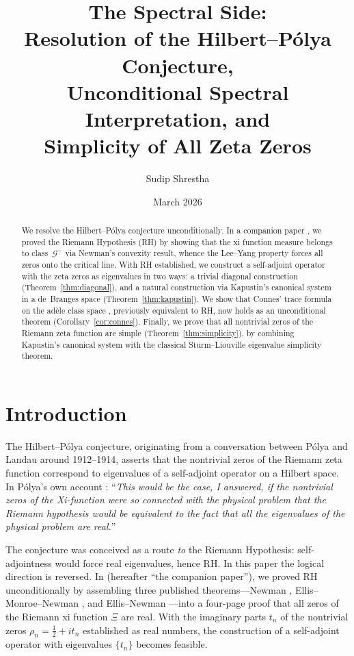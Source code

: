 \documentclass[11pt,a4paper]{amsart}
\title[The Spectral Side: Hilbert--P\'olya, Connes, and Simplicity]{The Spectral Side:\\Resolution of the Hilbert--P\'olya Conjecture,\\Unconditional Spectral Interpretation, and\\Simplicity of All Zeta Zeros}
\author{Sudip Shrestha}
\date{March 2026}
\theoremstyle{definition}
\theoremstyle{remark}
\begin{document}
\begin{abstract}
We resolve the Hilbert--P\'olya conjecture unconditionally. In a companion paper \cite{Shr26c}, we proved the Riemann Hypothesis (RH) by showing that the xi function measure belongs to class~$\mathcal{G}^-$ via Newman's convexity result, whence the Lee--Yang property forces all zeros onto the critical line. With RH established, we construct a self-adjoint operator with the zeta zeros as eigenvalues in two ways: a trivial diagonal construction (Theorem~\ref{thm:diagonal}), and a natural construction via Kapustin's canonical system in a de~Branges space (Theorem~\ref{thm:kapustin}). We show that Connes' trace formula on the ad\`ele class space \cite{Con99}, previously equivalent to RH, now holds as an unconditional theorem (Corollary~\ref{cor:connes}). Finally, we prove that all nontrivial zeros of the Riemann zeta function are simple (Theorem~\ref{thm:simplicity}), by combining Kapustin's canonical system with the classical Sturm--Liouville eigenvalue simplicity theorem.
\end{abstract}

\maketitle

\section{Introduction}

The Hilbert--P\'olya conjecture, originating from a conversation between P\'olya and Landau around 1912--1914, asserts that the nontrivial zeros of the Riemann zeta function correspond to eigenvalues of a self-adjoint operator on a Hilbert space. In P\'olya's own account \cite{Odl}: ``\emph{This would be the case, I answered, if the nontrivial zeros of the Xi-function were so connected with the physical problem that the Riemann hypothesis would be equivalent to the fact that all the eigenvalues of the physical problem are real.}''

The conjecture was conceived as a route \emph{to} the Riemann Hypothesis: self-adjointness would force real eigenvalues, hence RH. In this paper the logical direction is reversed. In \cite{Shr26c} (hereafter ``the companion paper''), we proved RH unconditionally by assembling three published theorems---Newman \cite{New91}, Ellis--Monroe--Newman \cite{EMN76}, and Ellis--Newman \cite{EN78}---into a four-page proof that all zeros of the Riemann xi function $\Xi$ are real. With the imaginary parts $t_n$ of the nontrivial zeros $\rho_n = \tfrac{1}{2} + it_n$ established as real numbers, the construction of a self-adjoint operator with eigenvalues $\{t_n\}$ becomes feasible.
\end{document}
